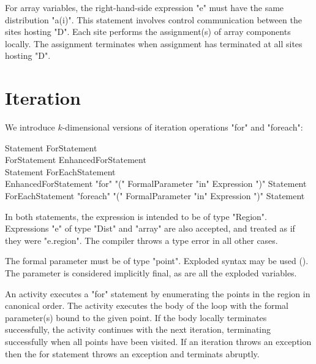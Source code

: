 For array variables, the right-hand-side
expression \xcd"e" 
must have the same distribution \xcd"a(i)". This
statement involves control communication between the sites hosting
\xcd"D". Each site performs the assignment(s) of array components
locally. The assignment terminates when assignment has terminated at
all sites hosting \xcd"D".


%

\section{Iteration}\label{ForLoop}
\label{ForAllLoop}

We introduce $k$-dimensional versions of iteration operations \xcd"for" and 
\xcd"foreach":

\begin{grammar}
Statement \: ForStatement \\
ForStatement \: EnhancedForStatement \\
Statement \: ForEachStatement \\
EnhancedForStatement \: 
      \xcd"for" \xcd"(" FormalParameter \xcd"in" Expression \xcd")"
        Statement \\
ForEachStatement \: 
      \xcd"foreach" \xcd"(" FormalParameter \xcd"in" Expression \xcd")"
          Statement \\
\end{grammar}

In both statements, the expression is intended to be of type
\xcd"Region".  Expressions \xcd"e" of type \xcd"Dist" and
\xcd"array" are also accepted, and treated as if they were \xcd"e.region".
The compiler throws a type error in all other cases.

The formal parameter must be of type \xcd"point". Exploded syntax may
be used (). The parameter is considered
implicitly final, as are all the exploded variables. 

An activity executes a \xcd"for" statement by enumerating the points
in the region in canonical order. The activity executes the body of
the loop with the formal parameter(s) bound to the given point. If the
body locally terminates successfully, the activity continues with the
next iteration, terminating successfully when all points have been
visited. If an iteration throws an exception then the for statement
throws an exception and terminats abruptly.

